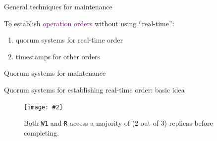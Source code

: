 \documentclass{beamer}
\newcommand{\fignocaption}[2]
{
  \begin{figure}[htp]
    \centering
      \texttt{[image: \#2]}
  \end{figure}
}
\newcommand{\fig}[3]
{
  \begin{figure}[htp]
    \centering
      \texttt{[image: \#2]}
      \caption[labelInTOC]{#3}
  \end{figure}
}
\newcommand{\largepurple}[1]{\textcolor{purple}{\large #1}}
\newcommand{\blue}[1]{\textcolor{blue}{#1}}
\begin{document}

\begin{frame}[label = order-establish-theory]{General techniques for
maintenance}

  To establish \largepurple{operation orders} without using ``real-time'':
  \begin{enumerate}
    \item quorum systems for real-time order
    \item timestamps for other orders
  \end{enumerate}
\end{frame}
\begin{frame}{Quorum systems for maintenance}
  \begin{block}{Quorum systems for establishing real-time order: basic idea}
  \fig{width = 0.85\textwidth}{fig/quorum-system-3ops-3replicas-example.pdf}
  {Both \texttt{W1} and \texttt{R} access a majority of (2 out of 3) replicas
  before completing.}
  \end{block}
\end{frame}
\end{document}
